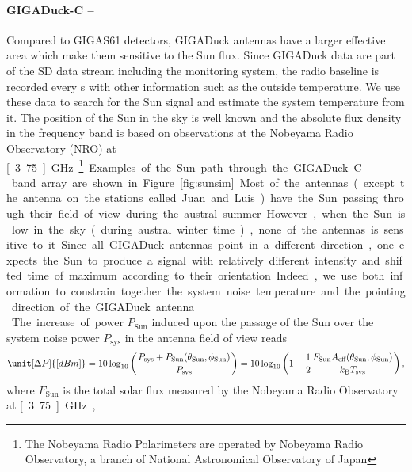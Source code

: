\paragraph{GIGADuck-C --}
Compared  to  GIGAS61  detectors,  GIGADuck  antennas  have  a  larger
effective  area which  make them  sensitive  to the  Sun flux.   Since
GIGADuck data are part of  the SD data stream including the monitoring
system, the radio baseline  is recorded every \unit[400]{s} with other
information  such as  the outside  temperature. We  use these  data to
search for the Sun signal and estimate the system temperature from it.
The position of the Sun in the sky is well known and the absolute flux
density in the frequency band is based on observations at the Nobeyama
Radio  Observatory  (NRO)  at \unit[3.75]{GHz}~\footnote{The  Nobeyama
  Radio  Polarimeters are  operated by  Nobeyama Radio  Observatory, a
  branch of  National Astronomical Observatory of  Japan}. Examples of
the  Sun  path  through  the   GIGADuck  C-band  array  are  shown  in
Figure~\ref{fig:sunsim}. Most  of the antennas (except  the antenna on
the stations called Juan and  Luis) have the Sun passing through their
field of view during the austral summer.  However, when the Sun is low
in  the sky  (during austral  winter time),  none of  the  antennas is
sensitive  to it.  Since all  GIGADuck antennas  point in  a different
direction, one  expects the  Sun to produce  a signal  with relatively
different  intensity and shifted  time of  maximum according  to their
orientation.  Indeed,  we use  both information to  constrain together
the  system  noise  temperature  and  the pointing  direction  of  the
GIGADuck antenna. \\
The increase of  power $P_\text{Sun}$ induced upon the  passage of the
Sun over the system noise power $P_\text{sys}$ in the antenna field of
view reads
\begin{equation}
  \label{eq:deltaP}
  \unit[\Delta  P]{[dBm]}  =  10\log_{10}\left(\frac{P_{\text{sys}}  +
    P_{\text{Sun}}(\theta_{\text{Sun}},\phi_{\text{Sun}})
  }{P_{\text{sys}}}     \right)    =    10\log_{10}\left(1+\frac{1}{2}
  \frac{F_{\text{Sun}}A_{\text{eff}}(\theta_{\text{Sun}},\phi_{\text{Sun}})}{k_\text{B}
    T_{\text{sys}}} \right),
\end{equation}
where  $F_{\text{Sun}}$  is  the  total  solar flux  measured  by  the
Nobeyama   Radio   Observatory~\cite{nobeyama}  at   \unit[3.75]{GHz},
